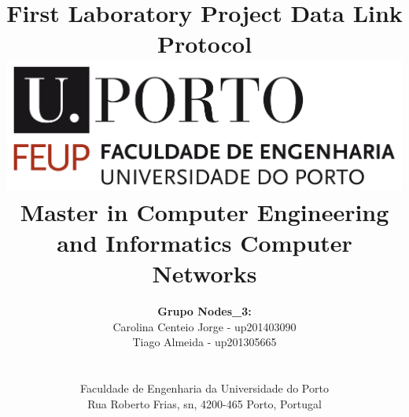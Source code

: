 \documentclass[a4paper]{article}
\begin{document}
\renewcommand{\figurename}{Fig.}

\setlength{\textwidth}{16cm}
\setlength{\textheight}{22cm}

\title{\Huge\textbf{First Laboratory Project}\linebreak\linebreak\linebreak
\Large\textbf{Data Link Protocol}\linebreak\linebreak
\linebreak\linebreak
\includegraphics[scale=0.1]{feup-logo.png}\linebreak\linebreak
\linebreak\linebreak
\Large{Master in Computer Engineering and Informatics} \linebreak\linebreak
\Large{Computer Networks}\linebreak
}

\author{\textbf{Grupo Nodes\_3:}\\
Carolina Centeio Jorge - up201403090 \\
Tiago Almeida - up201305665 \\
\linebreak\linebreak \\
 \\ Faculdade de Engenharia da Universidade do Porto \\ Rua Roberto Frias, s\/n, 4200-465 Porto, Portugal \linebreak\linebreak\linebreak
\linebreak\linebreak\vspace{1cm}}

\maketitle
\thispagestyle{empty}
\end{document}
